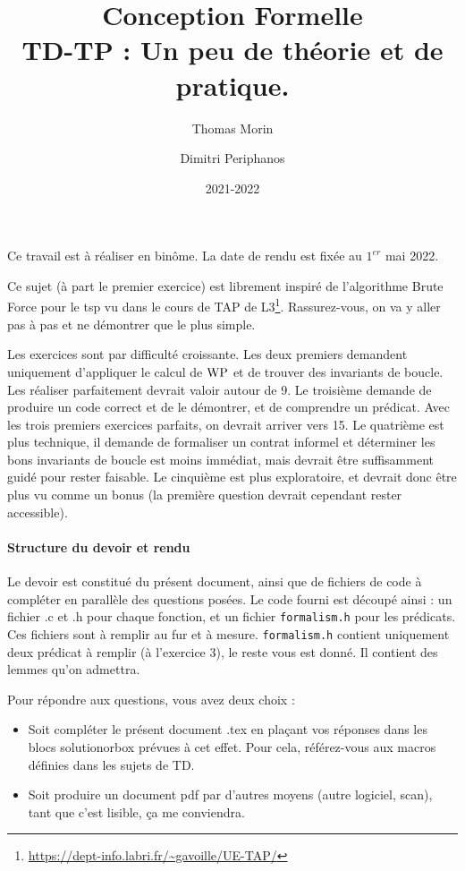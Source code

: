 \documentclass[11pt,answers]{exam}
\author{Thomas Morin \and Dimitri Periphanos}
\date{2021-2022}
\title{{\bf Conception Formelle} \\ TD-TP : Un peu de théorie et de pratique.}
\begin{document}
\maketitle

Ce travail est à réaliser en binôme. La date de rendu est fixée au $1^{er}$ mai 2022.

Ce sujet (à part le premier exercice) est librement inspiré de l’algorithme Brute Force pour le tsp vu dans le cours de TAP de L3\footnote{\url{https://dept-info.labri.fr/~gavoille/UE-TAP/}}.
Rassurez-vous, on va y aller pas à pas et ne démontrer que le plus simple.

Les exercices sont par difficulté croissante. Les deux premiers demandent uniquement d’appliquer le calcul de $\mathrm{WP}$ et de trouver des invariants de boucle.
Les réaliser parfaitement devrait valoir autour de 9.
Le troisième demande de produire un code correct et de le démontrer, et de comprendre un prédicat. Avec les trois premiers exercices parfaits, on devrait arriver vers 15.
Le quatrième est plus technique, il demande de formaliser un contrat informel et déterminer les bons invariants de boucle est moins immédiat, mais devrait être suffisamment guidé pour rester faisable.
Le cinquième est plus exploratoire, et devrait donc être plus vu comme un bonus (la première question devrait cependant rester accessible).

\paragraph{Structure du devoir et rendu}

Le devoir est constitué du présent document, ainsi que de fichiers de code à compléter en parallèle des questions posées.
Le code fourni est découpé ainsi : un fichier .c et .h pour chaque fonction, et 
un fichier \texttt{formalism.h} pour les prédicats.
Ces fichiers sont à remplir au fur et à mesure. \texttt{formalism.h} contient uniquement deux prédicat à remplir (à l’exercice 3), le reste vous est donné. Il contient des lemmes qu’on admettra.

Pour répondre aux questions, vous avez deux choix :
\begin{itemize}
    \item Soit compléter le présent document .tex en plaçant vos réponses dans les blocs solutionorbox prévues à cet effet. Pour cela, référez-vous aux macros définies dans les sujets de TD.
    \item Soit produire un document pdf par d’autres moyens (autre logiciel, scan), tant que c’est lisible, ça me conviendra.
\end{itemize}
\end{document}

